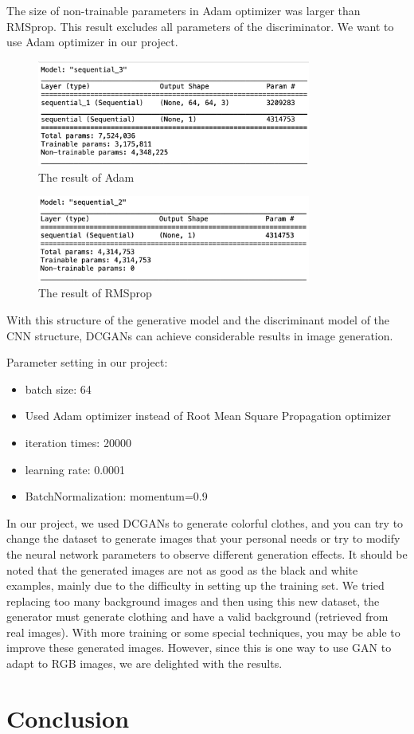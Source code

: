\documentclass[conference]{IEEEtran}
\begin{document}
    The size of non-trainable parameters in Adam optimizer was larger than RMSprop. This result excludes all parameters of the discriminator. We want to use Adam optimizer in our project.
    
    	\begin{figure}[h]
        \caption{The result of Adam}
	\includegraphics[width=9cm]{Adam.png}
	\end{figure}
	
	\begin{figure}[h]
        \caption{The result of RMSprop}
	\includegraphics[width=9cm]{RMSprop.png}
	\end{figure}
           
   With this structure of the generative model and the discriminant model of the CNN structure, DCGANs can achieve considerable results in image generation. 
   
   Parameter setting in our project:
	 \begin{itemize}
	 	\item batch size: 64
		\item Used Adam optimizer instead of Root Mean Square Propagation optimizer
		\item iteration times: 20000
		\item learning rate: 0.0001
		\item BatchNormalization: momentum=0.9
	 \end{itemize}
   	   	   
In our project, we used DCGANs to generate colorful clothes, and you can try to change the dataset to generate images that your personal needs or try to modify the neural network parameters to observe different generation effects. It should be noted that the generated images are not as good as the black and white examples, mainly due to the difficulty in setting up the training set. We tried replacing too many background images and then using this new dataset, the generator must generate clothing and have a valid background (retrieved from real images). With more training or some special techniques, you may be able to improve these generated images. However, since this is one way to use GAN to adapt to RGB images, we are delighted with the results.


   
   
    
    \section{Conclusion}\label{sec:conclusion}

    
    
\end{document}
